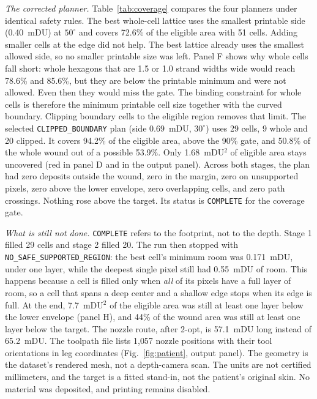 \documentclass[conference]{IEEEtran}
\begin{document}
\emph{The corrected planner.} Table~\ref{tab:coverage} compares the four
planners under identical safety rules. The best whole-cell lattice uses the
smallest printable side (0.40~mDU) at $50^\circ$ and covers 72.6\% of the
eligible area with 51 cells. Adding smaller cells at the edge did not help.
The best lattice already uses the smallest allowed side, so no smaller
printable size was left. Panel F shows why whole cells fall short:
whole hexagons that are 1.5 or 1.0 strand widths wide would reach 78.6\% and
85.6\%, but they are below the printable minimum and were not allowed. Even
then they would miss the gate. The binding constraint for whole cells is
therefore the minimum printable cell size together with the curved boundary.
Clipping boundary cells to the eligible region removes that limit. The
selected \texttt{CLIPPED\_BOUNDARY} plan (side 0.69~mDU, $30^\circ$) uses 29
cells, 9 whole and 20 clipped. It covers 94.2\% of the eligible area, above
the 90\% gate, and 50.8\% of the whole wound out of a possible 53.9\%. Only
1.68~mDU$^2$ of eligible area stays uncovered (red in panel D and in the
output panel). Across both stages, the plan had zero deposits outside the
wound, zero in the margin, zero on unsupported pixels, zero above the lower
envelope, zero overlapping cells, and zero path crossings. Nothing rose above
the target. Its status is \texttt{COMPLETE} for the coverage gate.

\emph{What is still not done.} \texttt{COMPLETE} refers to the footprint,
not to the depth. Stage 1 filled 29 cells and stage 2 filled 20. The run then
stopped with \texttt{NO\_SAFE\_SUPPORTED\_REGION}: the best cell's minimum
room was 0.171~mDU, under one layer, while the deepest single pixel still had
0.55~mDU of room. This happens because a cell is filled only when \emph{all}
of its pixels have a full layer of room, so a cell that spans a deep center
and a shallow edge stops when its edge is full. At the end, 7.7~mDU$^2$ of
the eligible area was still at least one layer below the lower envelope
(panel H), and 44\% of the wound area was still at least one layer below the
target. The nozzle route, after 2-opt, is 57.1~mDU long instead of 65.2~mDU.
The toolpath file lists 1{,}057 nozzle positions with their tool
orientations in leg coordinates (Fig.~\ref{fig:patient}, output panel). The
geometry is the dataset's rendered mesh, not a depth-camera scan. The units
are not certified millimeters, and the target is a fitted stand-in, not the
patient's original skin. No material was deposited, and printing remains
disabled.
\end{document}
